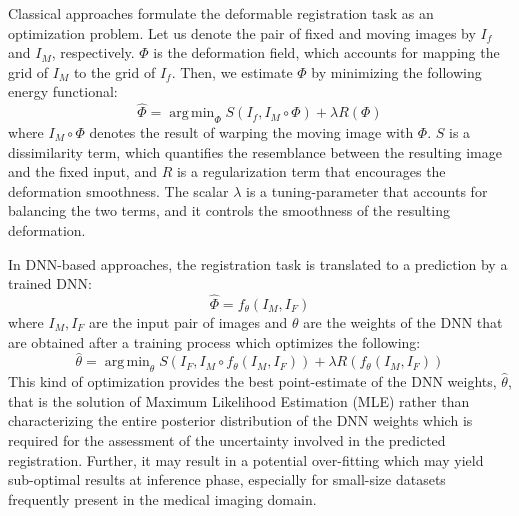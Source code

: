 \documentclass[preprint,authoryear]{elsarticle}
\DeclareMathOperator*{\argmin}{arg\,min}
\begin{document}
Classical approaches formulate the deformable registration task as an optimization problem. Let us denote the pair of fixed and moving images by $I_{f}$ and $I_M$, respectively. $\Phi$ is the deformation field, which accounts for mapping the grid of $I_M$ to the grid of $I_f$. Then, we estimate $\Phi$ by minimizing the following energy functional:
\begin{equation}
\hat{\Phi}=\argmin_\Phi {S(I_f,I_M\circ\Phi)+\lambda R(\Phi)} \label{eq:losseq}
\end{equation}
where $I_M\circ\Phi$ denotes the result of warping the moving image with $\Phi$. $S$ is a dissimilarity term, which quantifies the resemblance between the resulting image and the fixed input, and $R$ is a regularization term that encourages the deformation smoothness. The scalar $\lambda$ is a tuning-parameter that accounts for balancing the two terms, and it controls the smoothness of the resulting deformation. 

In DNN-based approaches, the registration task is translated to a prediction by a trained DNN:
\begin{equation}
\hat{\Phi} = f_{\theta}(I_{M},I_{F})
\end{equation}
where $I_{M},I_{F}$ are the input pair of images and $\theta$ are the weights of the DNN that are obtained after a training process which optimizes the following: 
\begin{equation}
\hat{\theta}= \argmin_\theta {S(I_F,I_M\circ f_\theta(I_{M},I_{F}))+\lambda R(f_\theta(I_{M},I_{F}))} \label{eq:lossdeep}
\end{equation}  
This kind of optimization provides the best point-estimate of the DNN weights, $\hat{\theta}$, that is the solution of Maximum Likelihood Estimation (MLE) rather than characterizing the entire posterior distribution of the DNN weights which is required for the assessment of the uncertainty involved in the predicted registration. Further, it may result in a potential over-fitting which may yield sub-optimal results at inference phase, especially for small-size datasets frequently present in the medical imaging domain.
\end{document}

